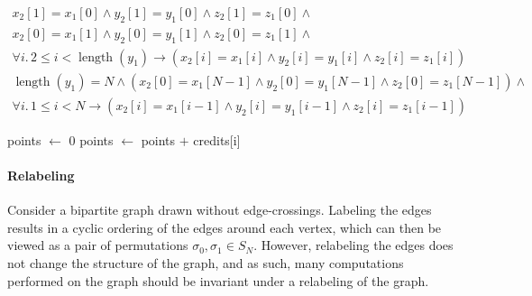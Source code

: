 \documentclass{llncs}
\DeclareMathOperator{\Perm}{Perm}
\DeclareMathOperator{\len}{length}
\begin{document}
\begin{multline*}x_{2}[1] = x_{1}[0] \wedge y_{2}[1] = y_{1}[0] \wedge z_{2}[1] = z_{1}[0] \wedge\\
x_{2}[0] = x_{1}[1] \wedge y_{2}[0] = y_{1}[1] \wedge z_{2}[0] = z_{1}[1] \wedge\\
\forall i.\, 2 \leq i < \len(y_{1}) \rightarrow (x_{2}[i] = x_{1}[i] \wedge y_{2}[i] = y_{1}[i] \wedge z_{2}[i] = z_{1}[i])
\end{multline*}
\begin{multline*}\len(y_{1}) = N \wedge (x_{2}[0] = x_{1}[N-1] \wedge y_{2}[0] = y_{1}[N-1] \wedge z_{2}[0] = z_{1}[N-1]) \wedge\\ \forall i.\, 1 \leq i < N \rightarrow (x_{2}[i] = x_{1}[i-1] \wedge y_{2}[i] = y_{1}[i-1] \wedge z_{2}[i] = z_{1}[i-1])
\end{multline*}

\begin{algorithm}
\begin{algorithmic}
\State points \(\gets\) 0
\State points \(\gets\) points \(+\) credits[i]
\EndIf
\EndFor
{}
\EndFunction
\end{algorithmic}
\end{algorithm}

\paragraph{Relabeling}
Consider a bipartite graph drawn without edge-crossings.  Labeling the edges results in a cyclic ordering of the edges around each vertex, which can then be viewed as a pair of permutations \(\sigma_{0}, \sigma_{1} \in S_{N}\).  However, relabeling the edges does not change the structure of the graph, and as such, many computations performed on the graph should be invariant under a relabeling of the graph.
\end{document}
